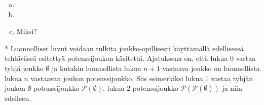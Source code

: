 \begin{tehtavasivu}
\begin{tehtava}
\end{tehtava}

\item 
\begin{enumerate}[a)]
\item 
\item 
\item  Miksi?
\end{enumerate}

\begin{tehtava}
    *
Luonnolliset luvut voidaan tulkita joukko-opillisesti käyttämällä edellisessä tehtävässä esitettyä potenssijoukon käsitettä. Ajatuksena on, että lukua $0$ vastaa tyhjä joukko $\emptyset$ ja kutakin luonnollista lukua $n + 1$ vastaava joukko on luonnollista lukua $n$ vastaavan joukon potenssijoukko. Siis esimerkiksi lukua $1$ vastaa tyhjän joukon $\emptyset$ potenssijoukko $\mathcal{P}(\emptyset)$, lukua $2$ potenssijoukko $\mathcal{P}(\mathcal{P}(\emptyset))$ ja niin edelleen. 
    \begin{alakohdat}
    \end{alakohdat}

    \begin{vastaus}
    

\end{vastaus}
\end{tehtava}
\end{tehtavasivu}
